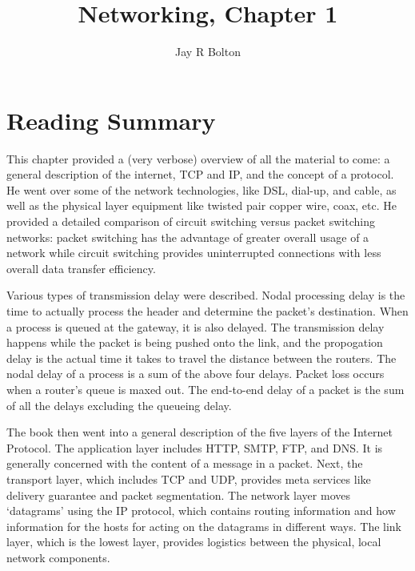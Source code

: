 \documentclass{article}
\title{Networking, Chapter 1}
\author{Jay R Bolton}
\begin{document}
\maketitle

\section*{Reading Summary}
This chapter provided a (very verbose) overview of all the material to come: a
general description of the internet, TCP and IP, and the concept of a protocol.
He went over some of the network technologies, like DSL, dial-up, and cable, as
well as the physical layer equipment like twisted pair copper wire, coax, etc.
He provided a detailed comparison of circuit switching versus packet switching
networks: packet switching has the advantage of greater overall usage of a
network while circuit switching provides uninterrupted connections with less
overall data transfer efficiency.

Various types of transmission delay were described. Nodal processing delay is
the time to actually process the header and determine the packet's destination.
When a process is queued at the gateway, it is also delayed. The transmission
delay happens while the packet is being pushed onto the link, and the
propogation delay is the actual time it takes to travel the distance between
the routers. The nodal delay of a process is a sum of the above four delays.
Packet loss occurs when a router's queue is maxed out. The end-to-end delay of
a packet is the sum of all the delays excluding the queueing delay.

The book then went into a general description of the five layers of the
Internet Protocol. The application layer includes HTTP, SMTP, FTP, and DNS. It
is generally concerned with the content of a message in a packet. Next, the
transport layer, which includes TCP and UDP, provides meta services like
delivery guarantee and packet segmentation. The network layer moves `datagrams'
using the IP protocol, which contains routing information and how information
for the hosts for acting on the datagrams in different ways. The link layer,
which is the lowest layer, provides logistics between the physical, local
network components.
\end{document}
